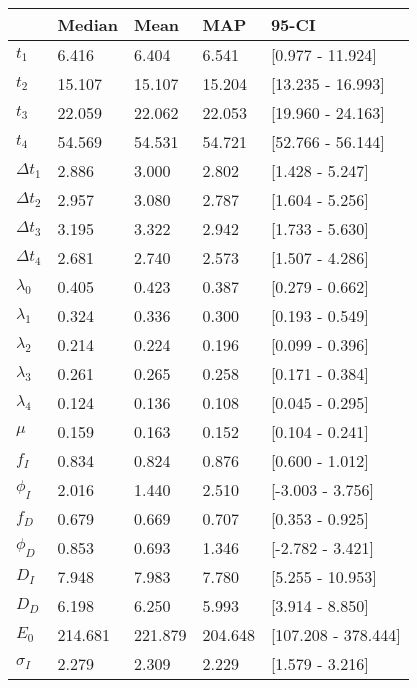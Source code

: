 \begin{tabular}{lllll}
\toprule
{} &   Median &     Mean &      MAP &                95-CI \\
\midrule
$t_1$        &    6.416 &    6.404 &    6.541 &     [0.977 - 11.924] \\
$t_2$        &   15.107 &   15.107 &   15.204 &    [13.235 - 16.993] \\
$t_3$        &   22.059 &   22.062 &   22.053 &    [19.960 - 24.163] \\
$t_4$        &   54.569 &   54.531 &   54.721 &    [52.766 - 56.144] \\
$\Delta t_1$ &    2.886 &    3.000 &    2.802 &      [1.428 - 5.247] \\
$\Delta t_2$ &    2.957 &    3.080 &    2.787 &      [1.604 - 5.256] \\
$\Delta t_3$ &    3.195 &    3.322 &    2.942 &      [1.733 - 5.630] \\
$\Delta t_4$ &    2.681 &    2.740 &    2.573 &      [1.507 - 4.286] \\
$\lambda_0$  &    0.405 &    0.423 &    0.387 &      [0.279 - 0.662] \\
$\lambda_1$  &    0.324 &    0.336 &    0.300 &      [0.193 - 0.549] \\
$\lambda_2$  &    0.214 &    0.224 &    0.196 &      [0.099 - 0.396] \\
$\lambda_3$  &    0.261 &    0.265 &    0.258 &      [0.171 - 0.384] \\
$\lambda_4$  &    0.124 &    0.136 &    0.108 &      [0.045 - 0.295] \\
$\mu$        &    0.159 &    0.163 &    0.152 &      [0.104 - 0.241] \\
$f_I$        &    0.834 &    0.824 &    0.876 &      [0.600 - 1.012] \\
$\phi_I$     &    2.016 &    1.440 &    2.510 &     [-3.003 - 3.756] \\
$f_D$        &    0.679 &    0.669 &    0.707 &      [0.353 - 0.925] \\
$\phi_D$     &    0.853 &    0.693 &    1.346 &     [-2.782 - 3.421] \\
$D_I$        &    7.948 &    7.983 &    7.780 &     [5.255 - 10.953] \\
$D_D$        &    6.198 &    6.250 &    5.993 &      [3.914 - 8.850] \\
$E_0$        &  214.681 &  221.879 &  204.648 &  [107.208 - 378.444] \\
$\sigma_I$   &    2.279 &    2.309 &    2.229 &      [1.579 - 3.216] \\

\end{tabular}

